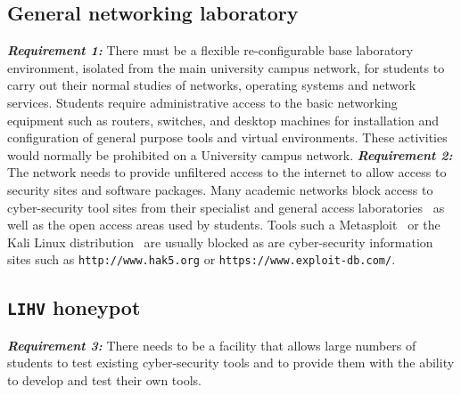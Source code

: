 \subsection{General networking laboratory}\label{subsec:GeneralLab}
\noindent \emph{\textbf{Requirement 1:}} There must be a flexible re-configurable base laboratory environment, isolated from the main university campus network, for students to carry out their normal studies of networks, operating systems and network services. Students require administrative access to the basic networking equipment such as routers, switches, and desktop machines for installation and configuration of general purpose tools and virtual environments. These activities would normally be prohibited on a University campus network.
\newline\newline
\noindent \emph{\textbf{Requirement 2:}} The network needs to provide unfiltered access to the internet to allow access to security sites and software packages. Many academic networks block access to cyber-security tool sites from their specialist and general access laboratories~\cite{ACGO:06,YYLCHJ:04} as well as the open access areas used by students. Tools such a Metasploit~\cite{R7:17} or the Kali Linux distribution~\cite{OS:17} are usually blocked as are cyber-security information sites such as \texttt{http://www.hak5.org} or \texttt{https://www.exploit-db.com/}.

\subsection{\texttt{LIHV} honeypot}\label{subsec:LabHoneypot}
\noindent \emph{\textbf{Requirement 3:}} There needs to be a facility that allows large numbers of students to test existing cyber-security tools and to provide them with the ability to develop and test their own tools. 

